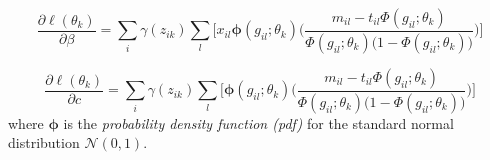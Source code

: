 \begin{equation} \label{derivative-b-f}
	\frac{\partial \ell(\theta_{k})}{\partial \beta} =  \sum_{i}  \gamma(z_{ik}) \sum_{l} \bigg[ x_{il} \mathbf{\phi}(g_{il};\theta_{k})\bigg(\frac{m_{il} - t_{il}\Phi(g_{il};\theta_{k})}{\Phi(g_{il};\theta_{k})\big(1-\Phi(g_{il};\theta_{k})\big)} \bigg) \bigg]
\end{equation}

\begin{equation} \label{derivative-c-f}
	\frac{\partial \ell(\theta_{k})}{\partial c} =  \sum_{i}  \gamma(z_{ik}) \sum_{l} \bigg[ \mathbf{\phi}(g_{il};\theta_{k})\bigg(\frac{m_{il} - t_{il}\Phi(g_{il};\theta_{k})}{\Phi(g_{il};\theta_{k})\big(1-\Phi(g_{il};\theta_{k})\big)} \bigg) \bigg]
\end{equation}
where $\mathbf{\phi}$ is the \emph{probability density function (pdf)} for the standard normal distribution $\mathcal{N}(0,1)$.